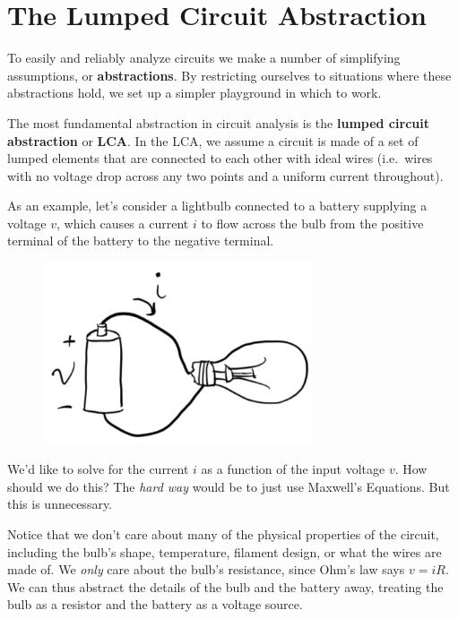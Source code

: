 \documentclass[
  letterpaper,
  DIV=11,
  numbers=noendperiod]{scrreprt}
\begin{document}
\hypertarget{the-lumped-circuit-abstraction-1}{%
\section{The Lumped Circuit
Abstraction}\label{the-lumped-circuit-abstraction-1}}

To easily and reliably analyze circuits we make a number of simplifying
assumptions, or \textbf{abstractions}. By restricting ourselves to
situations where these abstractions hold, we set up a simpler playground
in which to work.

The most fundamental abstraction in circuit analysis is the
\textbf{lumped circuit abstraction} or \textbf{LCA}. In the LCA, we
assume a circuit is made of a set of lumped elements that are connected
to each other with ideal wires (i.e.~wires with no voltage drop across
any two points and a uniform current throughout).

As an example, let's consider a lightbulb connected to a battery
supplying a voltage \(v\), which causes a current \(i\) to flow across
the bulb from the positive terminal of the battery to the negative
terminal.

\begin{figure}

{\centering \includegraphics[width=3.125in,height=\textheight]{circuits/./resources/image-20230212053314477.png}

}

\end{figure}

We'd like to solve for the current \(i\) as a function of the input
voltage \(v\). How should we do this? The \emph{hard way} would be to
just use Maxwell's Equations. But this is unnecessary.

Notice that we don't care about many of the physical properties of the
circuit, including the bulb's shape, temperature, filament design, or
what the wires are made of. We \emph{only} care about the bulb's
resistance, since Ohm's law says \(v=iR\). We can thus abstract the
details of the bulb and the battery away, treating the bulb as a
resistor and the battery as a voltage source.
\end{document}
